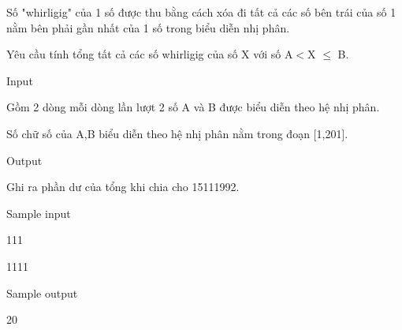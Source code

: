 



   Số "whirligig" của 1 số được thu bằng cách xóa đi tất cả các số bên trái của số 1 nằm bên phải gần nhất của 1 số trong biểu diễn nhị phân.  

   Yêu cầu tính tổng tất cả các số whirligig của số X với  số A$<$X $\le$ B.  

   Input  

   Gồm 2 dòng mỗi dòng lần lượt 2 số A và B được biểu diễn theo hệ nhị phân.  

   Số chữ số của A,B biểu diễn theo hệ nhị phân nằm trong đoạn [1,201].  

   Output  

   Ghi ra phần dư của tổng khi chia cho 15111992.  

   Sample input  

   111  

   1111  

   Sample output  

   20  



